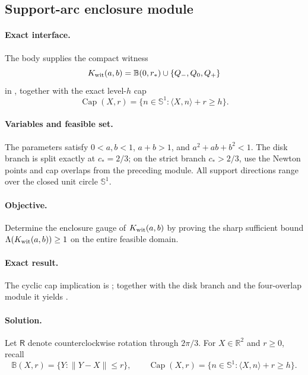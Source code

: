 \subsection{Support-arc enclosure module}
\label{subsec:nine-point-conclusion}

\paragraph{Exact interface.}
The body supplies the compact witness
\[
 K_{\rm wit}(a,b)=\mathbb B(0,r_*)\cup\{Q_-,Q_0,Q_+\}
\]
in , together with the exact level-$h$ cap
\[
 \operatorname{Cap}(X,r)
 =\{n\in\mathbb S^1:\langle X,n\rangle+r\ge h\}.
\]

\paragraph{Variables and feasible set.}
The parameters satisfy $0<a,b<1$, $a+b>1$, and
$a^2+ab+b^2<1$.  The disk branch is split exactly at $c_*=2/3$; on the
strict branch $c_*>2/3$, use the Newton points and cap overlaps from the
preceding module.  All support directions range over the closed unit circle
$\mathbb S^1$.

\paragraph{Objective.}
Determine the enclosure gauge of $K_{\rm wit}(a,b)$ by proving the sharp
sufficient bound $\Lambda(K_{\rm wit}(a,b))\ge1$ on the entire feasible
domain.

\paragraph{Exact result.}
The cyclic cap implication is ; together with the
disk branch and the four-overlap module it yields
.

\paragraph{Solution.}

Let $\mathsf R$ denote counterclockwise rotation through $2\pi/3$.  For
$X\in\mathbb R^2$ and $r\ge0$, recall
\[
 \mathbb B(X,r)=\{Y:\lVert Y-X\rVert\le r\},
 \qquad
 \operatorname{Cap}(X,r)
 =\{n\in\mathbb S^1:\langle X,n\rangle+r\ge h\}.
\]

